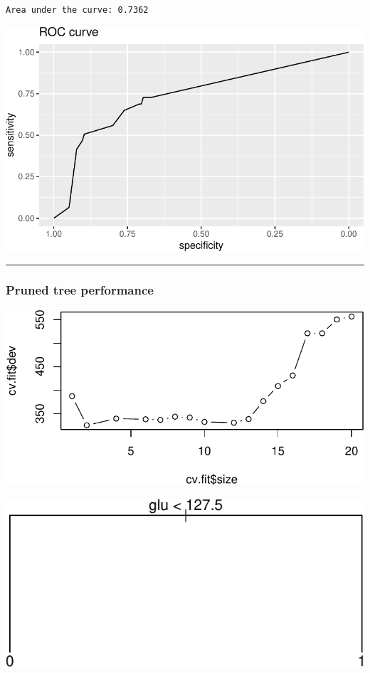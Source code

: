 \documentclass[
  letterpaper,
  DIV=11,
  numbers=noendperiod]{scrartcl}
\begin{document}
\begin{verbatim}
Area under the curve: 0.7362
\end{verbatim}

\includegraphics{L13_files/figure-pdf/unnamed-chunk-14-2.pdf}

\begin{center}\rule{0.5\linewidth}{0.5pt}\end{center}

\hypertarget{pruned-tree-performance}{%
\subsubsection{Pruned tree performance}\label{pruned-tree-performance}}

\includegraphics{L13_files/figure-pdf/unnamed-chunk-15-1.pdf}

\includegraphics{L13_files/figure-pdf/unnamed-chunk-15-2.pdf}
\end{document}
